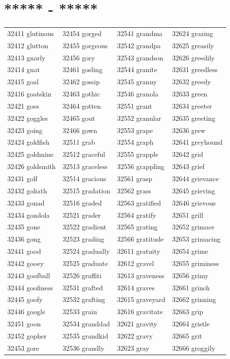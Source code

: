 \documentclass[10pt, oneside]{book}
\begin{document}
\begin{table}[h]
	\centering
	\section*{***** - *****}
	\begin{tabular}{l l l l}
32411 glutinous &32454 gorged &32541 grandma &32624 grazing\\
32412 glutton &32455 gorgeous &32542 grandpa &32625 greasily\\
32413 gnarly &32456 gory &32543 grandson &32626 greedily\\
32414 gnat &32461 gosling &32544 granite &32631 greedless\\
32415 goal &32462 gossip &32545 granny &32632 greedy\\
32416 goatskin &32463 gothic &32546 granola &32633 green\\
32421 goes &32464 gotten &32551 grant &32634 greeter\\
32422 goggles &32465 gout &32552 granular &32635 greeting\\
32423 going &32466 gown &32553 grape &32636 grew\\
32424 goldfish &32511 grab &32554 graph &32641 greyhound\\
32425 goldmine &32512 graceful &32555 grapple &32642 grid\\
32426 goldsmith &32513 graceless &32556 grappling &32643 grief\\
32431 golf &32514 gracious &32561 grasp &32644 grievance\\
32432 goliath &32515 gradation &32562 grass &32645 grieving\\
32433 gonad &32516 graded &32563 gratified &32646 grievous\\
32434 gondola &32521 grader &32564 gratify &32651 grill\\
32435 gone &32522 gradient &32565 grating &32652 grimace\\
32436 gong &32523 grading &32566 gratitude &32653 grimacing\\
32441 good &32524 gradually &32611 gratuity &32654 grime\\
32442 gooey &32525 graduate &32612 gravel &32655 griminess\\
32443 goofball &32526 graffiti &32613 graveness &32656 grimy\\
32444 goofiness &32531 grafted &32614 graves &32661 grinch\\
32445 goofy &32532 grafting &32615 graveyard &32662 grinning\\
32446 google &32533 grain &32616 gravitate &32663 grip\\
32451 goon &32534 granddad &32621 gravity &32664 gristle\\
32452 gopher &32535 grandkid &32622 gravy &32665 grit\\
32453 gore &32536 grandly &32623 gray &32666 groggily\\
	\end{tabular}
 \end{table}
\end{document}
